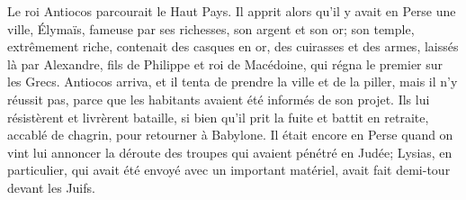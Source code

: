 Le roi Antiocos parcourait le Haut Pays.
Il apprit alors qu’il y avait en Perse une ville, Élymaïs,
	fameuse par ses richesses, son argent et son or;
	son temple, extrêmement riche,
		contenait des casques en or, des cuirasses et des armes,
	laissés là par Alexandre, fils de Philippe et roi de Macédoine,
	qui régna le premier sur les Grecs.
Antiocos arriva, et il tenta de prendre la ville et de la piller,
	mais il n’y réussit pas, parce que les habitants avaient été informés de son projet.
Ils lui résistèrent et livrèrent bataille,
	si bien qu’il prit la fuite et battit en retraite, accablé de chagrin,
	pour retourner à Babylone.
Il était encore en Perse
	quand on vint lui annoncer la déroute des troupes qui avaient pénétré en Judée;
Lysias, en particulier, qui avait été envoyé avec un important matériel,
	avait fait demi-tour devant les Juifs.
